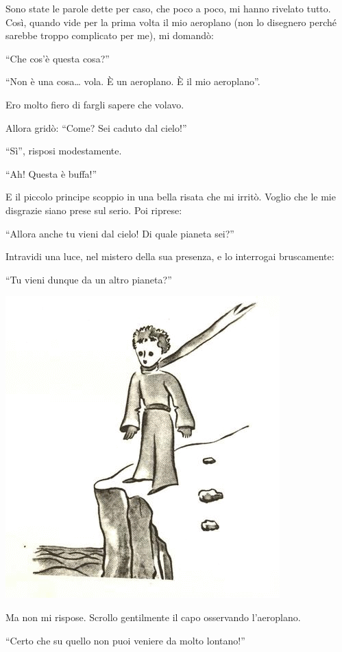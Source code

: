 \documentclass[11pt]{scrbook}
\begin{document}
Sono state le parole dette per caso, che poco a poco, mi hanno rivelato tutto. Così, quando vide per la prima volta il mio aeroplano (non lo disegnero perché sarebbe troppo complicato per me), mi domandò:

``Che cos'è questa cosa?''

``Non è una cosa\ldots{} vola. È un aeroplano. È il mio aeroplano''.

Ero molto fiero di fargli sapere che volavo.

Allora gridò: ``Come? Sei caduto dal cielo!''

``Sì'', risposi modestamente.

``Ah! Questa è buffa!''

E il piccolo principe scoppio in una bella risata che mi irritò. Voglio che le mie disgrazie siano prese sul serio. Poi riprese:

``Allora anche tu vieni dal cielo! Di quale pianeta sei?''

Intravidi una luce, nel mistero della sua presenza, e lo interrogai bruscamente:

``Tu vieni dunque da un altro pianeta?''

\begin{center}
\includegraphics{img/3a}
\end{center}

Ma non mi rispose. Scrollo gentilmente il capo osservando l'aeroplano.

``Certo che su quello non puoi veniere da molto lontano!''
\end{document}
